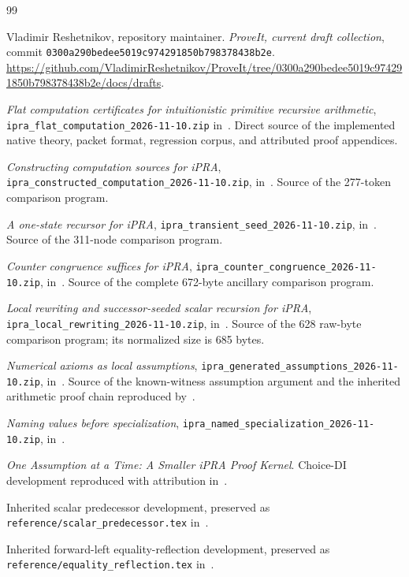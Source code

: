 \documentclass[11pt,letterpaper]{article}
\theoremstyle{definition}\newtheorem{definition}[theorem]{Definition}
\theoremstyle{remark}\newtheorem{remark}[theorem]{Remark}
\newcommand{\file}[1]{{\small\nolinkurl{#1}}}
\begin{document}
\begin{thebibliography}{99}
\raggedright
{}
Vladimir Reshetnikov, repository maintainer.
\emph{ProveIt, current draft collection}, commit
\file{0300a290bedee5019c974291850b798378438b2e}.
\url{https://github.com/VladimirReshetnikov/ProveIt/tree/0300a290bedee5019c974291850b798378438b2e/docs/drafts}.

\emph{Flat computation certificates for intuitionistic primitive
recursive arithmetic}, \file{ipra_flat_computation_2026-11-10.zip}
in~\cite{snapshot}. Direct source of the implemented native theory,
packet format, regression corpus, and attributed proof appendices.

\emph{Constructing computation sources for iPRA},
\file{ipra_constructed_computation_2026-11-10.zip}, in~\cite{snapshot}.
Source of the 277-token comparison program.

\emph{A one-state recursor for iPRA},
\file{ipra_transient_seed_2026-11-10.zip}, in~\cite{snapshot}.
Source of the 311-node comparison program.

\emph{Counter congruence suffices for iPRA},
\file{ipra_counter_congruence_2026-11-10.zip}, in~\cite{snapshot}.
Source of the complete 672-byte ancillary comparison program.

\emph{Local rewriting and successor-seeded scalar recursion for iPRA},
\file{ipra_local_rewriting_2026-11-10.zip}, in~\cite{snapshot}.
Source of the 628 raw-byte comparison program; its normalized size is 685 bytes.

\emph{Numerical axioms as local assumptions},
\file{ipra_generated_assumptions_2026-11-10.zip}, in~\cite{snapshot}.
Source of the known-witness assumption argument and the inherited
arithmetic proof chain reproduced by~\cite{flat}.

\emph{Naming values before specialization},
\file{ipra_named_specialization_2026-11-10.zip}, in~\cite{snapshot}.

\emph{One Assumption at a Time: A Smaller iPRA Proof Kernel}.
Choice-DI development reproduced with attribution in~\cite{named,generated,flat}.

Inherited scalar predecessor development, preserved as
\file{reference/scalar_predecessor.tex} in~\cite{flat}.

Inherited forward-left equality-reflection development, preserved as
\file{reference/equality_reflection.tex} in~\cite{flat}.


\end{thebibliography}
\end{document}
